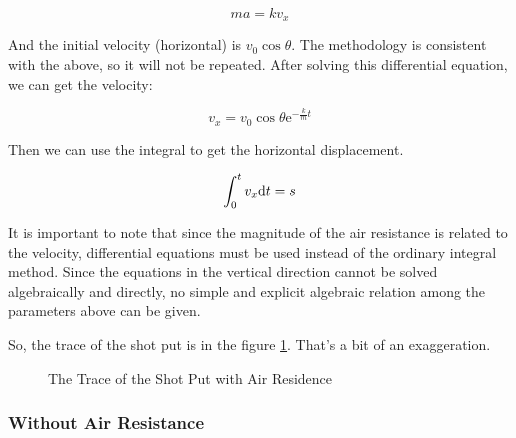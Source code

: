 \documentclass{article}
\begin{document}
\begin{equation*}
    ma = kv_x
\end{equation*}

And the initial velocity (horizontal) is $v_0\cos\theta$. The methodology is consistent with the above, so it will not be repeated. After solving this differential equation, we can get the velocity:

\begin{equation}
    v_x=v_0\cos\theta\mathrm{e}^{-\frac{k}{m}t}
\end{equation}

Then we can use the integral to get the horizontal displacement.

\begin{equation}
    \int^t_0v_x\mathrm{d} t=s
\end{equation}

It is important to note that since the magnitude of the air resistance is related to the velocity, differential equations must be used instead of the ordinary integral method. Since the equations in the vertical direction cannot be solved algebraically and directly, no simple and explicit algebraic relation among the parameters above can be given.

So, the trace of the shot put is in the figure \ref{fig:trace-with-residence}. That's a bit of an exaggeration.

\begin{figure}[H]
    \centering
    \caption{The Trace of the Shot Put with Air Residence}
    \label{fig:trace-with-residence}
\end{figure}

\subsubsection{Without Air Resistance}

\label{subsubsection:horizontal-motion-without-residence}
\end{document}
